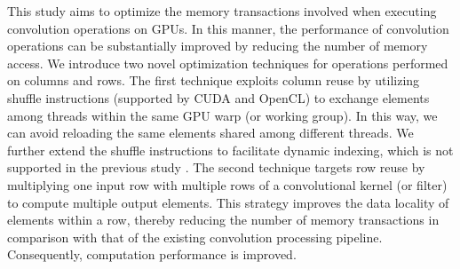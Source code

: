 
This study aims to optimize the memory transactions involved when executing convolution operations on GPUs. In this manner, the performance of convolution operations can be substantially improved by reducing the number of memory access. We introduce two novel optimization techniques for operations performed on  columns and rows. The first technique exploits column reuse by utilizing shuffle instructions
(supported by CUDA and OpenCL) to exchange elements among threads within the same GPU warp (or working group). In this
way, we can avoid reloading the same elements shared among different threads. We further extend the shuffle instructions
to facilitate dynamic indexing, which is not supported in the previous study \cite{vasilache2014fast}. The second
technique targets row reuse by multiplying one input row with multiple rows of a convolutional kernel (or filter)
to compute multiple output elements. This strategy improves the data locality of elements within a row, thereby reducing the number of memory transactions in comparison with that of the existing convolution processing pipeline. Consequently, computation performance is improved.



